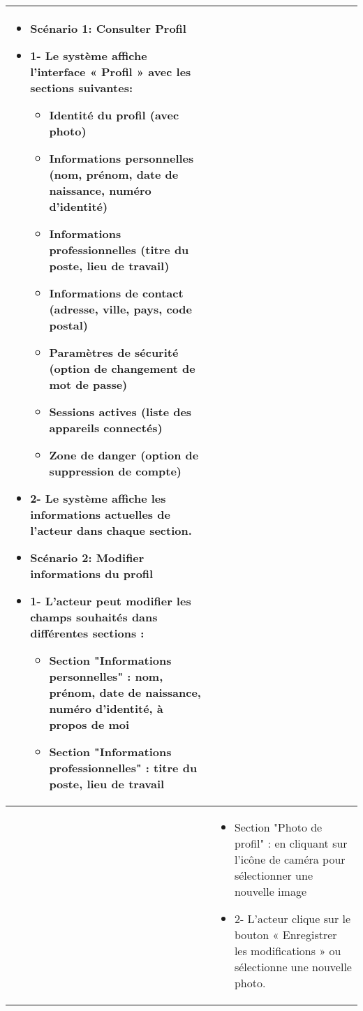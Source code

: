 \begin{longtable}{|>{\arraybackslash}p{4.2cm}|>{\arraybackslash}p{12.5cm}|}
\begin{itemize}[label=]
  \item\textbf{Scénario 1: Consulter Profil}
    \item{1-} Le système affiche l'interface « Profil » avec les sections suivantes:
    \begin{itemize}
      \item Identité du profil (avec photo)
      \item Informations personnelles (nom, prénom, date de naissance, numéro d'identité)
      \item Informations professionnelles (titre du poste, lieu de travail)
      \item Informations de contact (adresse, ville, pays, code postal)
      \item Paramètres de sécurité (option de changement de mot de passe)
      \item Sessions actives (liste des appareils connectés)
      \item Zone de danger (option de suppression de compte)
    \end{itemize}
    \item{2-} Le système affiche les informations actuelles de l'acteur dans chaque section.
   \item\textbf{Scénario 2: Modifier informations du profil}
   \item{1-} L'acteur peut modifier les champs souhaités dans différentes sections :
   \begin{itemize}
       \item Section "Informations personnelles" : nom, prénom, date de naissance, numéro d'identité, à propos de moi
     \item Section "Informations professionnelles" : titre du poste, lieu de travail
   \end{itemize}

\end{itemize}\\
\hline
\textbf{}&
\begin{itemize}[label=]

     \item Section "Photo de profil" : en cliquant sur l'icône de caméra pour sélectionner une nouvelle image

 \item{2-} L'acteur clique sur le bouton « Enregistrer les modifications » ou sélectionne une nouvelle photo.


\end{itemize}
\end{longtable}
